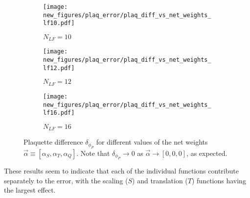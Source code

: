 \begin{figure}
  \centering
  \begin{subfigure}[t]{0.48\textwidth}
    \caption{$N_{LF} = 10$}
    \texttt{[image: new\_figures/plaq\_error/plaq\_diff\_vs\_net\_weights\_lf10.pdf]}
  \end{subfigure}
  \begin{subfigure}[t]{0.48\textwidth}
    \caption{$N_{LF} = 12$}
    \texttt{[image: new\_figures/plaq\_error/plaq\_diff\_vs\_net\_weights\_lf12.pdf]}
  \end{subfigure}
  \begin{subfigure}[b]{0.48\textwidth}
    \caption{$N_{LF} = 16$}
    \texttt{[image: new\_figures/plaq\_error/plaq\_diff\_vs\_net\_weights\_lf16.pdf]}
  \end{subfigure}
  \caption{Plaquette difference $\delta_{\phi_{P}}$ for different values of the
    net weights $\vec{\alpha} \equiv [\alpha_{S}, \alpha_{T}, \alpha_{Q}]$.
    Note that $\delta_{\phi_{P}} \rightarrow 0$ as $\vec{\alpha} \rightarrow
  [0, 0, 0]$, as expected.}%
\label{fig:plaq_diff_vs_net_weights}
\end{figure}
%
These results seem to indicate that each of the individual functions contribute
separately to the error, with the scaling ($S$) and translation ($T$) functions
having the largest effect.
